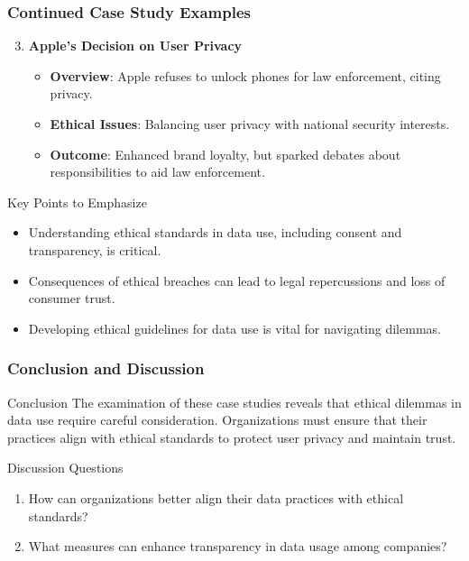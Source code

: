 \documentclass[aspectratio=169]{beamer}
\begin{document}
\begin{frame}[fragile]
    \frametitle{Continued Case Study Examples}
    \begin{enumerate}
        \setcounter{enumi}{2}
        \item \textbf{Apple's Decision on User Privacy}
            \begin{itemize}
                \item \textbf{Overview}: Apple refuses to unlock phones for law enforcement, citing privacy.
                \item \textbf{Ethical Issues}: Balancing user privacy with national security interests.
                \item \textbf{Outcome}: Enhanced brand loyalty, but sparked debates about responsibilities to aid law enforcement.
            \end{itemize}
    \end{enumerate}
    \begin{block}{Key Points to Emphasize}
        \begin{itemize}
            \item Understanding ethical standards in data use, including consent and transparency, is critical.
            \item Consequences of ethical breaches can lead to legal repercussions and loss of consumer trust.
            \item Developing ethical guidelines for data use is vital for navigating dilemmas.
        \end{itemize}
    \end{block}
\end{frame}

\begin{frame}[fragile]
    \frametitle{Conclusion and Discussion}
    \begin{block}{Conclusion}
        The examination of these case studies reveals that ethical dilemmas in data use require careful consideration. Organizations must ensure that their practices align with ethical standards to protect user privacy and maintain trust.
    \end{block}
    
    \begin{block}{Discussion Questions}
        \begin{enumerate}
            \item How can organizations better align their data practices with ethical standards?
            \item What measures can enhance transparency in data usage among companies?
        \end{enumerate}
    \end{block}
\end{frame}
\end{document}
